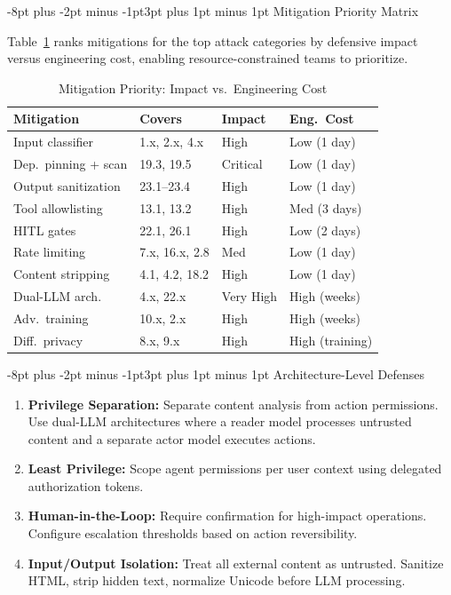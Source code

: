 \documentclass[conference]{IEEEtran}
\makeatletter
\renewcommand{\subsection}{\@startsection{subsection}{2}{\z@}%
  {-8pt plus -2pt minus -1pt}{3pt plus 1pt minus 1pt}%
  {\normalfont\normalsize\bfseries\sffamily\color{accentblue}}}
\newcommand{\tableheaderrow}{\rowcolor{accentblue}}
\renewcommand{\thead}[1]{\textbf{\color{white}\sffamily #1}}
\makeatother
\begin{document}
\subsection{Mitigation Priority Matrix}

Table~\ref{tab:mitigation_priority} ranks mitigations for the top attack categories by defensive impact versus engineering cost, enabling resource-constrained teams to prioritize.

\begin{table}[!htbp]
\centering
\caption{Mitigation Priority: Impact vs.\ Engineering Cost}
\label{tab:mitigation_priority}
\renewcommand{\arraystretch}{1.1}
\scriptsize\sffamily
\begin{tabular}{p{2.2cm}p{1.6cm}p{1.2cm}p{1.8cm}}
\toprule
\tableheaderrow \thead{Mitigation} & \thead{Covers} & \thead{Impact} & \thead{Eng.\ Cost} \\
\midrule
\rowcolor{rowalt} Input classifier & 1.x, 2.x, 4.x & High & Low (1 day) \\
Dep.\ pinning + scan & 19.3, 19.5 & Critical & Low (1 day) \\
\rowcolor{rowalt} Output sanitization & 23.1--23.4 & High & Low (1 day) \\
Tool allowlisting & 13.1, 13.2 & High & Med (3 days) \\
\rowcolor{rowalt} HITL gates & 22.1, 26.1 & High & Low (2 days) \\
Rate limiting & 7.x, 16.x, 2.8 & Med & Low (1 day) \\
\rowcolor{rowalt} Content stripping & 4.1, 4.2, 18.2 & High & Low (1 day) \\
Dual-LLM arch. & 4.x, 22.x & Very High & High (weeks) \\
\rowcolor{rowalt} Adv.\ training & 10.x, 2.x & High & High (weeks) \\
Diff.\ privacy & 8.x, 9.x & High & High (training) \\
\bottomrule
\end{tabular}
\end{table}

\subsection{Architecture-Level Defenses}
\begin{enumerate}[leftmargin=*]
    \item \textbf{Privilege Separation:} Separate content analysis from action permissions. Use dual-LLM architectures where a reader model processes untrusted content and a separate actor model executes actions.
    \item \textbf{Least Privilege:} Scope agent permissions per user context using delegated authorization tokens.
    \item \textbf{Human-in-the-Loop:} Require confirmation for high-impact operations. Configure escalation thresholds based on action reversibility.
    \item \textbf{Input/Output Isolation:} Treat all external content as untrusted. Sanitize HTML, strip hidden text, normalize Unicode before LLM processing.
\end{enumerate}
\end{document}
